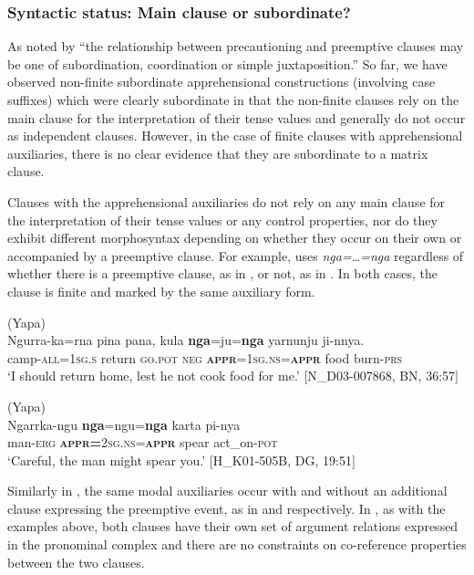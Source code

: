 \documentclass[output=paper,colorlinks,citecolor=brown]{langscibook}
\begin{document}
\subsubsection{Syntactic status: Main clause or subordinate?}
\label{subsubsec:syntacticstatus}

As noted by \citet{vuillermet_workshop_2018} ``the relationship between precautioning and preemptive clauses may be one of subordination, coordination or simple juxtaposition.'' So far, we have observed non-finite subordinate apprehensional constructions (involving case suffixes) which were clearly subordinate in that the non-finite clauses rely on the main clause for the interpretation of their tense values and generally do not occur as independent clauses. However, in the case of finite clauses with apprehensional auxiliaries, there is no clear evidence that they are subordinate to a matrix clause.

Clauses with the apprehensional auxiliaries do not rely on any main clause for the interpretation of their tense values or any control properties, nor do they exhibit different morphosyntax depending on whether they occur on their own or accompanied by a preemptive clause. For example,  uses \textit{nga=\ldots=nga} regardless of whether there is a preemptive clause, as in , or not, as in . In both cases, the clause is finite and marked by the same auxiliary form. 

\ea 
\textnormal{ (Yapa)} \\
\gll Ngurra-ka=rna pina pana, kula \textbf{nga}=ju=\textbf{nga} yarnunju ji-nnya. \\
camp-\textsc{all=1sg.s} return \textsc{go.pot} \textsc{neg} \textbf{\textsc{appr}}=\textsc{1sg.ns=\textbf{appr}} food burn-\textsc{prs} \\
\glt `I should return home, lest he not cook food for me.' $[$N\_D03-007868, BN, 36:57$]$
\label{ex:bro45}
\z

\ea 
\textnormal{ (Yapa)} \\
\gll Ngarrka-ngu \textbf{nga}=ngu=\textbf{nga} karta pi-nya \\
man-\textsc{erg} \textbf{\textsc{appr=}}\textsc{2sg.ns=\textbf{appr}} spear act\_on-\textsc{pot} \\
\glt `Careful, the man might spear you.' $[$H\_K01-505B, DG, 19:51$]$
\label{ex:bro46}
\z

Similarly in , the same modal auxiliaries occur with and without an additional clause expressing the preemptive event, as in  and  respectively. In , as with the  examples above, both clauses have their own set of argument relations expressed in the pronominal complex and there are no constraints on co-reference properties between the two clauses.
\end{document}
